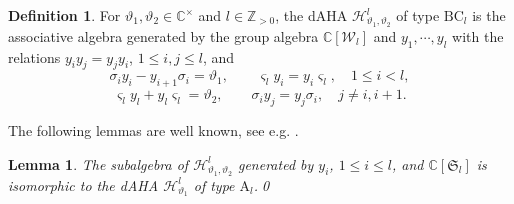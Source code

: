\documentclass[11pt,reqno]{amsart}
\numberwithin{equation}{section}
\newtheorem{lem}[thm]{Lemma}
\theoremstyle{definition}
\newtheorem{dfn}[thm]{Definition}
\theoremstyle{remark}
\newcommand{\C}{\mathbb{C}}
\newcommand{\Z}{\mathbb{Z}}
\newcommand{\fkS}{\mathfrak{S}}
\newcommand{\scrW}{\mathscr{W}}
\newcommand{\bC}{\mathbb{C}}
\newcommand{\lle}{\leqslant}
\begin{document}
\begin{dfn}\label{def:dAHA-B}
For $\vartheta_1,\vartheta_2\in\bC^\times$ and $l\in\Z_{>0}$, the dAHA $\mathscr{H}_{\vartheta_1,\vartheta_2}^l$ of type $\mathrm{BC}_l$ is the associative algebra generated by the group algebra $\bC[\scrW_l]$ and $y_1,\cdots,y_l$ with the relations $y_iy_j=y_jy_i$, $1\lle i,j\lle l$, and
\[
\sigma_iy_i-y_{i+1}\sigma_i=\vartheta_1,\qquad \varsigma_ly_i=y_i\varsigma_l,\quad 1\lle i< l,
\]
\[
\varsigma_ly_l+y_l\varsigma_l=\vartheta_2,\qquad \sigma_iy_j=y_j\sigma_i,\quad j\ne i,i+1.
\]
\end{dfn}
The following lemmas are well known, see e.g. \cite[Section 2]{Chen2014twisted}.
\begin{lem}
The subalgebra of $\mathscr{H}_{\vartheta_1,\vartheta_2}^l$ generated by $y_i$, $1\lle i\lle l$, and $\C[\fkS_l]$ is isomorphic to the dAHA $\mathscr{H}_{\vartheta_1}^l$ of type $\mathrm A_l$.\qed
\end{lem}
\end{document}
